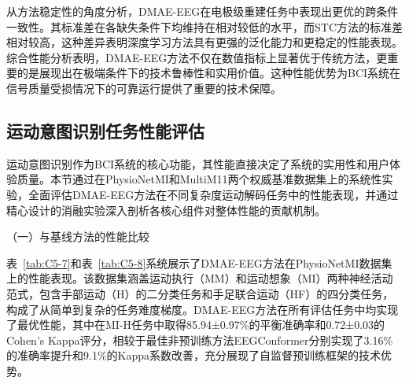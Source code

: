 从方法稳定性的角度分析，DMAE-EEG在电极级重建任务中表现出更优的跨条件一致性。其标准差在各缺失条件下均维持在相对较低的水平，而STC方法的标准差相对较高，这种差异表明深度学习方法具有更强的泛化能力和更稳定的性能表现。
综合性能分析表明，DMAE-EEG方法不仅在数值指标上显著优于传统方法，更重要的是展现出在极端条件下的技术鲁棒性和实用价值。这种性能优势为BCI系统在信号质量受损情况下的可靠运行提供了重要的技术保障。


\subsection{运动意图识别任务性能评估}

运动意图识别作为BCI系统的核心功能，其性能直接决定了系统的实用性和用户体验质量。本节通过在PhysioNetMI和MultiM11两个权威基准数据集上的系统性实验，全面评估DMAE-EEG方法在不同复杂度运动解码任务中的性能表现，并通过精心设计的消融实验深入剖析各核心组件对整体性能的贡献机制。


（一）与基线方法的性能比较

表~\ref{tab:C5-7}和表~\ref{tab:C5-8}系统展示了DMAE-EEG方法在PhysioNetMI数据集上的性能表现。该数据集涵盖运动执行（MM）和运动想象（MI）两种神经活动范式，包含手部运动（H）的二分类任务和手足联合运动（HF）的四分类任务，构成了从简单到复杂的任务难度梯度。DMAE-EEG方法在所有评估任务中均实现了最优性能，其中在MI-H任务中取得85.94±0.97\%的平衡准确率和0.72±0.03的Cohen's Kappa评分，相较于最佳非预训练方法EEGConformer分别实现了3.16\%的准确率提升和9.1\%的Kappa系数改善，充分展现了自监督预训练框架的技术优势。

